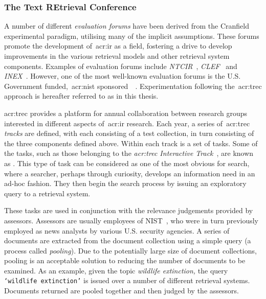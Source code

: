 \subsubsection{The Text REtrieval Conference}\label{sec:ir_background:paradigms:trec}
A number of different \emph{evaluation forums} have been derived from the Cranfield experimental paradigm, utilising many of the implicit assumptions. These forums promote the development of~\gls{acr:ir} as a field, fostering a drive to develop improvements in the various retrieval models and other retrieval system components. Examples of evaluation forums include \emph{NTCIR}~\citep{kando1999ntcir}, \emph{CLEF}~\citep{braschler2001clef} and \emph{INEX}~\citep{fuhr2006advances}. However, one of the most well-known evaluation forums is the U.S. Government funded,~\gls{acr:nist} sponsored~~\citep{harman1993trec1}. Experimentation following the~\gls{acr:trec} approach is hereafter referred to as  in this thesis.

\gls{acr:trec} provides a platform for annual collaboration between research groups interested in different aspects of~\gls{acr:ir} research. Each year, a series of~\gls{acr:trec} \emph{tracks} are defined, with each consisting of a test collection, in turn consisting of the three components defined above. Within each track is a set of tasks. Some of the tasks, such as those belonging to the \emph{\gls{acr:trec} Interactive Track}~\citep{over2001trec}, are known as . This type of task can be considered as one of the most obvious for search, where a searcher, perhaps through curiosity, develops an information need in an ad-hoc fashion. They then begin the search process by issuing an exploratory query to a retrieval system.

These tasks are used in conjunction with the relevance judgements provided by assessors. Assessors are usually employees of NIST~\citep{robertson2008history_ir_evaluation}, who were in turn previously employed as news analysts by various U.S. security agencies. A series of documents are extracted from the document collection using a simple query (a process called \emph{pooling}). Due to the potentially large size of document collections, pooling is an acceptable solution to reducing the number of documents to be examined. As an example, given the topic \emph{wildlife extinction,} the query \texttt{`wildlife extinction'} is issued over a number of different retrieval systems. Documents returned are pooled together and then judged by the assessors.

